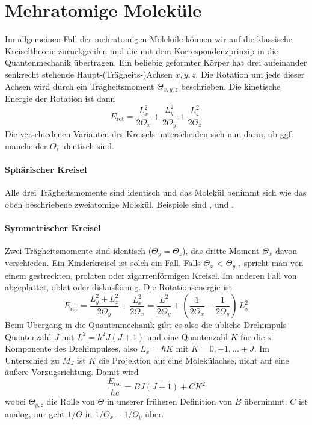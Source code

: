 \section{Mehratomige Moleküle}

Im allgemeinen Fall der mehratomigen Moleküle können wir auf die klassische Kreiseltheorie zurückgreifen und die mit dem Korrespondenzprinzip in die Quantenmechanik übertragen. Ein beliebig geformter Körper hat drei aufeinander senkrecht stehende Haupt-(Trägheits-)Achsen $x,y,z$. Die Rotation um jede dieser Achsen wird durch ein Trägheitsmoment $\Theta_{x,y,z}$ beschrieben. Die kinetische Energie der Rotation ist dann
\begin{equation}
E_\text{rot} = \frac{L_x^2}{2 \Theta_x} + \frac{L_y^2}{2 \Theta_y} + \frac{L_z^2}{2 \Theta_z} 
\end{equation}
Die verschiedenen Varianten des Kreisels unterscheiden sich nun darin, ob ggf. manche der $\Theta_i$ identisch sind.

\paragraph{Sphärischer Kreisel} Alle drei Trägheitsmomente sind identisch und das Molekül benimmt sich wie das oben beschriebene zweiatomige Molekül. Beispiele sind ,  und .
\begin{marginfigure}
\end{marginfigure}

\paragraph{Symmetrischer Kreisel} Zwei Trägheitsmomente sind identisch ($\Theta_y = \Theta_z$), das dritte Moment $\Theta_x$ davon verschieden. Ein Kinderkreisel ist solch ein Fall. Falls $\Theta_x$  < $\Theta_{y,z}$ spricht man von  einem gestreckten, prolaten oder zigarrenförmigen Kreisel. Im anderen Fall von abgeplattet, oblat oder diskusförmig. Die Rotationsenergie ist
\begin{equation}
E_\text{rot} = \frac{L_y^2 + L_z^2}{2 \Theta_y} + \frac{L_x^2}{2 \Theta_x} 
= \frac{L^2 }{2 \Theta_y} + \left( \frac{1}{2 \Theta_x} - \frac{1}{2 \Theta_y} \right) \, L_x^2
\end{equation}
Beim Übergang in die Quantenmechanik gibt es also die übliche Drehimpuls-Quantenzahl $J$ mit $L^2 = \hbar^2 J (J+1)$ und eine Quantenzahl $K$ für die x-Komponente des Drehimpulses, also $L_x = \hbar K$ mit $K = 0, \pm 1, ... \pm J$. Im Unterschied zu $M_J$ ist $K$ die Projektion auf eine Molekülachse, nicht auf eine äußere Vorzugsrichtung. Damit wird 
\begin{equation}
\frac{E_\text{rot}}{hc} = B J (J + 1) + C K^2
\end{equation}
wobei $\Theta_{y,z}$ die Rolle von $\Theta$ in unserer früheren Definition von $B$ übernimmt. $C$ ist analog, nur geht $1/\Theta$ in $1/ \Theta_x - 1/ \Theta_y$ über.

